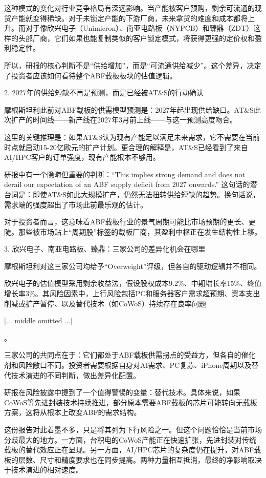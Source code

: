 \documentclass[11pt]{ctexart}
\begin{document}
这种模式的变化对行业竞争格局有深远影响。当产能被客户预购，剩余可流通的现货产能就变得稀缺。对于未锁定产能的下游厂商，未来拿货的难度和成本都将上升。而对于像欣兴电子（Unimicron）、南亚电路板（NYPCB）和臻鼎（ZDT）这样的头部厂商，它们如果也能复制类似的客户锁定模式，将获得更强的定价权和盈利稳定性。

所以，研报的核心判断不是“供给增加”，而是“可流通供给减少”。这个差异，决定了投资者应该如何看待整个ABF载板板块的估值逻辑。

2. 2027年的供给短缺不再是预测，而是已经被AT\&S的行动确认

摩根斯坦利此前对ABF载板的供需模型预测是：2027年起出现供给缺口。AT\&S此次扩产的时间线——新产线在2027年3月前上线——与这一预测高度吻合。

这里的关键推理是：如果AT\&S认为现有产能足以满足未来需求，它不需要在当前时点就启动15-20亿欧元的扩产计划。更合理的解释是，AT\&S已经看到了来自AI/HPC客户的订单强度，现有产能根本不够用。

研报中有一个隐晦但重要的判断：“This implies strong demand and does not derail our expectation of an ABF supply deficit from 2027 onwards.” 这句话的潜台词是：即使AT\&S如此大规模扩产，仍然无法扭转供给短缺的趋势。换句话说，需求端的强度超出了市场此前最乐观的估计。

对于投资者而言，这意味着ABF载板行业的景气周期可能比市场预期的更长、更陡。那些被市场贴上“周期股”标签的载板厂商，其盈利中枢正在发生结构性上移。

3. 欣兴电子、南亚电路板、臻鼎：三家公司的差异化机会在哪里

摩根斯坦利对这三家公司均给予“Overweight”评级，但各自的驱动逻辑并不相同。

欣兴电子的估值模型采用剩余收益法，假设股权成本9.2\%、中期增长率15\%、终值增长率3\%。其风险因素中，上行风险包括PC和服务器客户需求超预期、资本支出削减或扩产暂停、以及替代技术（如CoWoS）持续存在良率问题

[... middle omitted ...]

。

三家公司的共同点在于：它们都处于ABF载板供需拐点的受益方，但各自的催化剂和风险敞口不同。投资者需要根据自身对AI需求、PC复苏、iPhone周期以及替代技术演进的不同判断，做出差异化配置。

研报在风险披露中提到了一个值得警惕的变量：替代技术。具体来说，如果CoWoS等先进封装技术持续推进，部分原本需要ABF载板的芯片可能转向无载板方案，这将从根本上改变ABF的需求结构。

这份报告对此着墨不多，只是将其列为下行风险之一。但这个问题恰恰是当前市场分歧最大的地方。一方面，台积电的CoWoS产能正在快速扩张，先进封装对传统载板的替代效应正在显现。另一方面，AI/HPC芯片的复杂度仍在提升，对ABF载板的层数、尺寸和精度要求也在同步提高。两种力量相互抵消，最终的净影响取决于技术演进的相对速度。
\end{document}
